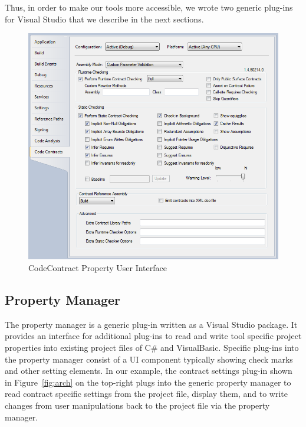 \documentclass[10pt, conference, compsocconf]{IEEEtran}
\newcommand{\csharp}{C\#}
\begin{document}
Thus, in order to make our tools more accessible, we wrote two generic
plug-ins for Visual Studio that we describe in the next sections.

\begin{figure}[tb!]
\begin{center}
  \hspace*{-3mm}\includegraphics[width=1.3\columnwidth]{propertyUI.png}
\end{center}
\vspace*{-3mm}
\caption{CodeContract Property User Interface}
\label{fig:propertyui}
\vspace*{-3mm}
\end{figure}

\subsection{Property Manager}
The property manager is a generic plug-in written as a Visual Studio
package. It provides an interface for additional plug-ins to read and
write tool specific project properties into existing project files of
\csharp{} and VisualBasic. Specific plug-ins into the
property manager consist of a UI component typically showing check
marks and other setting elements. In our example, the contract
settings plug-in shown in Figure~\ref{fig:arch} on the top-right plugs
into the generic property manager to read contract specific settings
from the project file, display them, and to write changes from user
manipulations back to the project file via the property manager.
\end{document}

